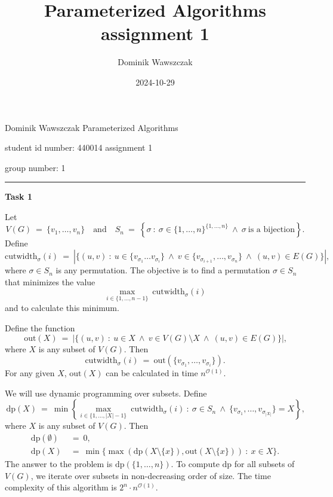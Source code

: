 \documentclass[12pt]{article}
\title{Parameterized Algorithms assignment 1}
\author{Dominik Wawszczak}
\date{2024-10-29}
\begin{document}
	\setlength{\parindent}{0 cm}
	
	Dominik Wawszczak \hfill Parameterized Algorithms
	
	student id number: 440014 \hfill assignment 1
	
	group number: 1
	
	\bigskip
	\hrule
	\bigskip
	
	\textbf{Task 1}
	
	\medskip
	
	Let
	\[ V(G) \ = \ \{v_{1}, \ldots, v_{n}\} \quad \text{and} \quad S_{n} \ = \
	\left\{ \sigma \ : \ \sigma \in \{1, \ldots, n\}^{\{1, \ldots, n\}} \ \wedge
	\ \sigma \ \text{is a bijection} \right\} \text{.} \]
	Define
	\[ \text{cutwidth}_{\sigma}(i) \ = \ |\{(u, v) \ : \ u \in \{v_{\sigma_{1}}
	\ldots v_{\sigma_{i}}\} \ \wedge \ v \in \{v_{\sigma_{i + 1}}, \ldots,
	v_{\sigma_{n}}\} \ \wedge \ (u, v) \in E(G)\}| \text{,} \]
	where \(\sigma \in S_{n}\) is any permutation. The objective is to find a
	permutation \(\sigma \in S_{n}\) that minimizes the value
	\[ \underset{i \in \{1, \ldots, n - 1\}}{\max} \
	\text{cutwidth}_{\sigma}(i) \]
	and to calculate this minimum.
	
	\medskip
	
	Define the function
	\[ \text{out}(X) \ = \ |\{(u, v) \ : \ u \in X \ \wedge \ v \in V(G)
	\setminus X \ \wedge \ (u, v) \in E(G)\}| \text{,} \]
	where \(X\) is any subset of \(V(G)\). Then
	\[ \text{cutwidth}_{\sigma}(i) \ = \ \text{out}(\{v_{\sigma_{1}}, \ldots,
	v_{\sigma_{i}}\}) \text{.} \]
	For any given \(X\), \(\text{out}(X)\) can be calculated in time
	\(n^{\mathcal{O}(1)}\).
	
	\medskip
	
	We will use dynamic programming over subsets. Define
	\[ \text{dp}(X) \ = \ \min \left\{ \underset{i \in
	\{1, \ldots, |X| - 1\}}{\max} \ \text{cutwidth}_{\sigma}(i) \ : \ \sigma \in
	S_{n} \ \wedge \ \{v_{\sigma_{1}}, \ldots, v_{\sigma_{|X|}}\} = X \right\}
	\text{,} \]
	where \(X\) is any subset of \(V(G)\). Then
	\begin{align*}
		\text{dp}(\emptyset) \ &= \ 0 \text{,} \\
		\text{dp}(X) \ &= \ \min \{\max(\text{dp}(X \setminus \{x\}),
		\text{out}(X \setminus \{x\})) \ : \ x \in X\} \text{.}
	\end{align*}
	The answer to the problem is \(\text{dp}(\{1, \ldots, n\})\). To compute
	\(\text{dp}\) for all subsets of \(V(G)\), we iterate over subsets in
	non-decreasing order of size. The time complexity of this algorithm is
	\(2^{n} \cdot n^{\mathcal{O}(1)}\).
	
\end{document}
